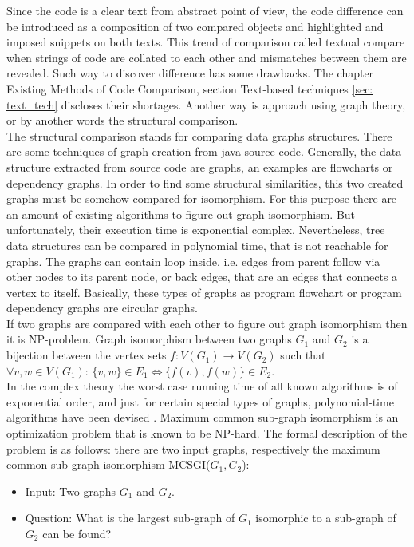\documentclass{report}
\begin{document}
Since the code is a clear text from abstract point of view, the code difference can be introduced as a composition of two compared objects and highlighted and imposed snippets on both texts. This trend of comparison called textual compare when strings of code are collated to each other and mismatches between them are revealed. Such way to discover difference has some drawbacks. The chapter Existing Methods of Code Comparison, section Text-based techniques \ref{sec: text_tech} discloses their shortages. Another way is approach using graph theory, or by another words the structural comparison.
\\
The structural comparison stands for comparing data graphs structures. There are some techniques of graph creation from java source code. Generally, the data structure extracted from source code are graphs, an examples are flowcharts or dependency graphs. In order to find some structural similarities, this two created graphs must be somehow compared for isomorphism. For this purpose there are an amount of existing algorithms to figure out graph isomorphism. But unfortunately, their execution time is exponential complex. Nevertheless, tree data structures can be compared in polynomial time, that is not reachable for graphs. The graphs can contain loop inside, i.e. edges from parent follow via other nodes to its parent node, or back edges, that are an edges that connects a vertex to itself. Basically, these types of graphs as program flowchart or program dependency graphs are circular graphs. 
\\
If two graphs are compared with each other to figure out graph isomorphism then it is NP-problem. Graph isomorphism between two graphs $G_{1}$ and $G_{2}$ is a bijection between the vertex sets $f: V(G_{1}) \rightarrow V(G_{2}) $ such that \\ $ \forall v, w \in V(G_{1})$:  $ \{v,w\} \in E_{1} \iff \{ f(v), f(w)\} \in E_{2}$. 
\\
In the complex theory the worst case running time of all known algorithms is of exponential order, and just for certain special types of graphs, polynomial-time algorithms have been devised \cite{graph_isomorphism_is}. Maximum common sub-graph isomorphism is an optimization problem that is known to be NP-hard. The formal description of the problem is as follows:
there are two input graphs, respectively the maximum common sub-graph isomorphism MCSGI($ G_{1}, G_{2}$):

\begin{itemize}
	\item     Input: Two graphs $ G_{1}$ and $G_{2}$.
	\item     Question: What is the largest sub-graph of  $ G_{1}$ isomorphic to a sub-graph of  $ G_{2}$ can be found?
\end{itemize}
\end{document}
